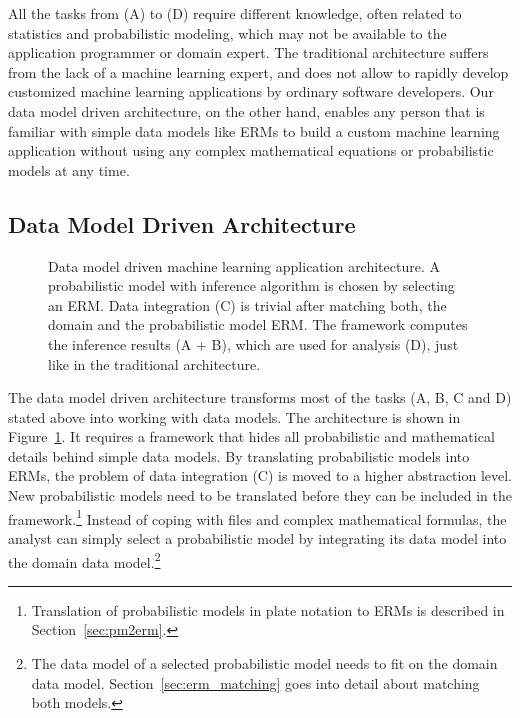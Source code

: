 All the tasks from (A) to (D) require different knowledge, often related to statistics and probabilistic modeling, which may not be available to the application programmer or domain expert. The traditional architecture suffers from the lack of a machine learning expert, and does not allow to rapidly develop customized machine learning applications by ordinary software developers. Our data model driven architecture, on the other hand, enables any person that is familiar with simple data models like ERMs to build a custom machine learning application without using any complex mathematical equations or probabilistic models at any time.

\newpage %

\subsection{Data Model Driven Architecture}

\begin{figure}
\centering
\scalebox{\tikzScale}{\adjustTikzSize }
\caption[Data model driven machine learning application architecture]{Data model driven machine learning application architecture. A probabilistic model with inference algorithm is chosen by selecting an ERM. Data integration (C) is trivial after matching both, the domain and the probabilistic model ERM. The framework computes the inference results (A + B), which are used for analysis (D), just like in the traditional architecture.}\label{fig:ml-application-architecture-dm}
\end{figure}

The data model driven architecture transforms most of the tasks (A, B, C and D) stated above into working with data models. The architecture is shown in Figure~\ref{fig:ml-application-architecture-dm}. It requires a framework that hides all probabilistic and mathematical details behind simple data models. By translating probabilistic models into ERMs, the problem of data integration (C) is moved to a higher abstraction level. New probabilistic models need to be translated before they can be included in the framework.\footnote{Translation of probabilistic models in plate notation to ERMs is described in Section~\ref{sec:pm2erm}.} Instead of coping with files and complex mathematical formulas, the analyst can simply select a probabilistic model by integrating its data model into the domain data model.\footnote{The data model of a selected probabilistic model needs to fit on the domain data model. Section~\ref{sec:erm_matching} goes into detail about matching both models.}

